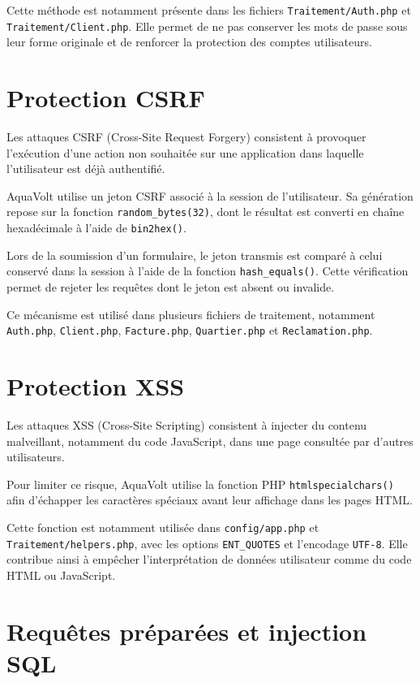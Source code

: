 Cette méthode est notamment présente dans les fichiers \texttt{Traitement/Auth.php} et \texttt{Traitement/Client.php}. Elle permet de ne pas conserver les mots de passe sous leur forme originale et de renforcer la protection des comptes utilisateurs.

\section{Protection CSRF}

Les attaques CSRF (Cross-Site Request Forgery) consistent à provoquer l'exécution d'une action non souhaitée sur une application dans laquelle l'utilisateur est déjà authentifié.

AquaVolt utilise un jeton CSRF associé à la session de l'utilisateur. Sa génération repose sur la fonction \texttt{random\_bytes(32)}, dont le résultat est converti en chaîne hexadécimale à l'aide de \texttt{bin2hex()}.

Lors de la soumission d'un formulaire, le jeton transmis est comparé à celui conservé dans la session à l'aide de la fonction \texttt{hash\_equals()}. Cette vérification permet de rejeter les requêtes dont le jeton est absent ou invalide.

Ce mécanisme est utilisé dans plusieurs fichiers de traitement, notamment \texttt{Auth.php}, \texttt{Client.php}, \texttt{Facture.php}, \texttt{Quartier.php} et \texttt{Reclamation.php}.

\section{Protection XSS}

Les attaques XSS (Cross-Site Scripting) consistent à injecter du contenu malveillant, notamment du code JavaScript, dans une page consultée par d'autres utilisateurs.

Pour limiter ce risque, AquaVolt utilise la fonction PHP \texttt{htmlspecialchars()} afin d'échapper les caractères spéciaux avant leur affichage dans les pages HTML.

Cette fonction est notamment utilisée dans \texttt{config/app.php} et \texttt{Traitement/helpers.php}, avec les options \texttt{ENT\_QUOTES} et l'encodage \texttt{UTF-8}. Elle contribue ainsi à empêcher l'interprétation de données utilisateur comme du code HTML ou JavaScript.

\section{Requêtes préparées et injection SQL}


